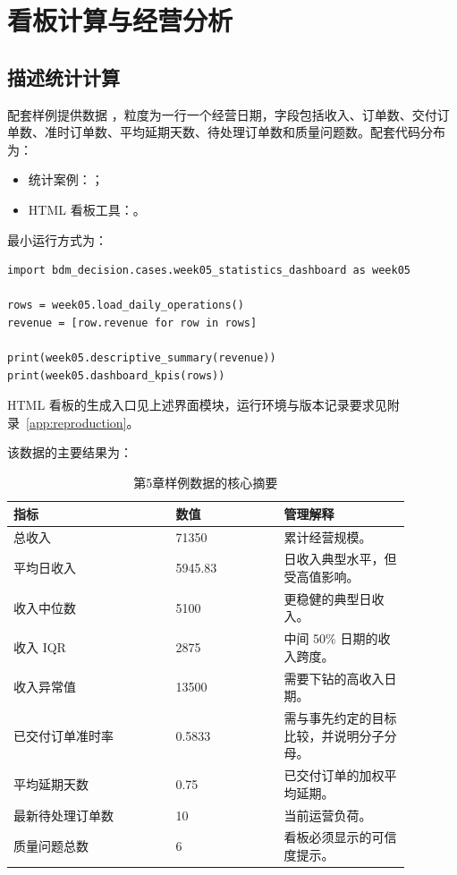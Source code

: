 \section{看板计算与经营分析}
\subsection{描述统计计算}

配套样例提供数据 ，粒度为一行一个经营日期，字段包括收入、订单数、交付订单数、准时订单数、平均延期天数、待处理订单数和质量问题数。配套代码分布为：
\begin{itemize}
  \item 统计案例：；
  \item HTML 看板工具：。
\end{itemize}

最小运行方式为：
\begin{lstlisting}[style=pythonstyle,caption={运行第5章统计摘要}]
import bdm_decision.cases.week05_statistics_dashboard as week05

rows = week05.load_daily_operations()
revenue = [row.revenue for row in rows]

print(week05.descriptive_summary(revenue))
print(week05.dashboard_kpis(rows))
\end{lstlisting}

HTML 看板的生成入口见上述界面模块，运行环境与版本记录要求见附录~\ref{app:reproduction}。

该数据的主要结果为：
\begin{table}[htbp]
\centering
\caption{第5章样例数据的核心摘要}
\begin{tabular}{P{0.36\linewidth}P{0.24\linewidth}P{0.28\linewidth}}
\toprule
{}
指标 & 数值 & 管理解释\\
\midrule
总收入 & 71350 & 累计经营规模。\\
平均日收入 & 5945.83 & 日收入典型水平，但受高值影响。\\
收入中位数 & 5100 & 更稳健的典型日收入。\\
收入 IQR & 2875 & 中间 50\% 日期的收入跨度。\\
收入异常值 & 13500 & 需要下钻的高收入日期。\\
已交付订单准时率 & 0.5833 & 需与事先约定的目标比较，并说明分子分母。\\
平均延期天数 & 0.75 & 已交付订单的加权平均延期。\\
最新待处理订单数 & 10 & 当前运营负荷。\\
质量问题总数 & 6 & 看板必须显示的可信度提示。\\
\bottomrule
\end{tabular}
\end{table}

